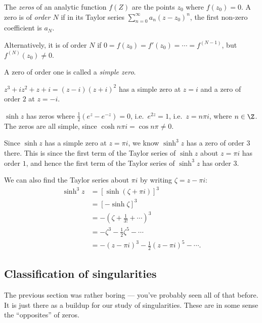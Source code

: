 \documentclass[a4paper]{article}
\begin{document}
\begin{defi}[Zeros]
  The \emph{zeros} of an analytic function $f(Z)$ are the points $z_0$ where $f(z_0) = 0$. A zero is of \emph{order $N$} if in its Taylor series $\sum_{n = 0}^\infty a_n (z - z_0)^n$, the first non-zero coefficient is $a_N$.

  Alternatively, it is of order $N$ if $0 = f(z_0) = f'(z_0) = \cdots = f^{(N - 1)}$, but $f^{(N)}(z_0) \not= 0$.
\end{defi}

\begin{defi}
  A zero of order one is called a \emph{simple zero}.
\end{defi}

\begin{eg}
  $z^3 + iz^2 + z + i = (z - i)(z + i)^2$ has a simple zero at $z = i$ and a zero of order $2$ at $z = -i$.
\end{eg}

\begin{eg}
  $\sinh z$ has zeros where $\frac{1}{2}(e^z - e^{-z}) = 0$, i.e.\ $e^{2z} = 1$, i.e.\ $z = n \pi i$, where $n \in \Z$. The zeros are all simple, since $\cosh n\pi i = \cos n \pi \not= 0$.
\end{eg}

\begin{eg}
  Since $\sinh z$ has a simple zero at $z = \pi i$, we know $\sinh^3 z$ has a zero of order $3$ there. This is since the first term of the Taylor series of $\sinh z$ about $z = \pi i$ has order $1$, and hence the first term of the Taylor series of $\sinh ^3 z$ has order $3$.

  We can also find the Taylor series about $\pi i$ by writing $\zeta = z - \pi i$:
  \begin{align*}
    \sinh^3 z &= [\sinh(\zeta + \pi i)]^3\\
    &= [-\sinh \zeta]^3\\
    &= -\left(\zeta + \frac{1}{3!} + \cdots \right)^3\\
    &= - \zeta^3 - \frac{1}{2} \zeta^5 - \cdots\\
    &= -(z - \pi i)^3 - \frac{1}{2} (z - \pi i)^5 - \cdots.
  \end{align*}
\end{eg}
\subsection{Classification of singularities}
The previous section was rather boring --- you've probably seen all of that before. It is just there as a buildup for our study of singularities. These are in some sense the ``opposites'' of zeros.
\end{document}
